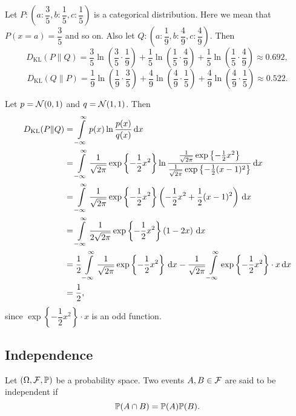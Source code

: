 \begin{example}
  Let $P:\left(a:\dfrac{3}{5}, b:\dfrac{1}{5}, c:\dfrac{1}{5}\right)$ is a categorical distribution. Here we mean that $P(x=a)=\dfrac{3}{5}$ and so on. Also let $Q:\left(a:\dfrac{1}{9}, b:\dfrac{4}{9}, c:\dfrac{4}{9}\right)$. Then
  $$D_{\mathrm{KL}}(P\|Q)=\dfrac{3}{5}\ln\left(\dfrac{3}{5}\cdot \dfrac{1}{9}\right)+\dfrac{1}{5}\ln\left(\dfrac{1}{5}\cdot \dfrac{4}{9}\right)+\dfrac{1}{5}\ln\left(\dfrac{1}{5}\cdot \dfrac{4}{9}\right)\approx 0.692,$$
  $$D_{\mathrm{KL}}(Q\|P)=\dfrac{1}{9}\ln\left(\dfrac{1}{9}\cdot \dfrac{3}{5}\right)+\dfrac{4}{9}\ln\left(\dfrac{4}{9}\cdot \dfrac{1}{5}\right)+\dfrac{4}{9}\ln\left(\dfrac{4}{9}\cdot \dfrac{1}{5}\right)\approx 0.522.$$
\end{example}

\begin{example}
  Let $p=\mathcal{N}(0,1)$ and $q=\mathcal{N}(1,1)$. Then
  \begin{align*}
    D_{\mathrm{KL}}(P\|Q)
     & =\int\limits_{-\infty}^\infty p(x)\ln\dfrac{p(x)}{q(x)}\,\mathrm{d} x                                                                                                                                                                \\
     & =\int\limits_{-\infty}^\infty \dfrac{1}{\sqrt{2\pi}}\exp\left\{-\dfrac{1}{2}x^2\right\}\ln\dfrac{\frac{1}{\sqrt{2\pi}}\exp\left\{-\frac{1}{2}x^2\right\}}{\frac{1}{\sqrt{2\pi}}\exp\left\{-\frac{1}{2}(x-1)^2\right\}}\,\mathrm{d} x \\
     & =\int\limits_{-\infty}^\infty \dfrac{1}{\sqrt{2\pi}}\exp\left\{-\dfrac{1}{2}x^2\right\}\left(-\dfrac{1}{2}x^2+\dfrac{1}{2}(x-1)^2\right)\,\mathrm{d} x                                                                               \\
     & =\int\limits_{-\infty}^\infty \dfrac{1}{2\sqrt{2\pi}}\exp\left\{-\dfrac{1}{2}x^2\right\}\left(1-2x\right)\,\mathrm{d} x                                                                                                              \\
     & =\dfrac{1}{2}\int\limits_{-\infty}^\infty\dfrac{1}{\sqrt{2\pi}}\exp\left\{-\dfrac{1}{2}x^2\right\}\,\mathrm{d} x-\dfrac{1}{\sqrt{2\pi}}\int\limits_{-\infty}^\infty\exp\left\{-\dfrac{1}{2}x^2\right\}\cdot x\,\mathrm{d} x                    \\
     & =\dfrac{1}{2},
  \end{align*}
  since $\exp\left\{-\dfrac{1}{2}x^2\right\}\cdot x$ is an odd function.
\end{example}

\subsection{Independence}
\begin{definition}
  Let $(\Omega, \mathcal{F},\mathbb{P})$ be a probability space. Two events $A,B\in\mathcal{F}$ are said to be independent if
  \begin{equation}
    \mathbb{P}(A \cap B)=\mathbb{P}(A)\mathbb{P}(B).
  \end{equation}
\end{definition}

